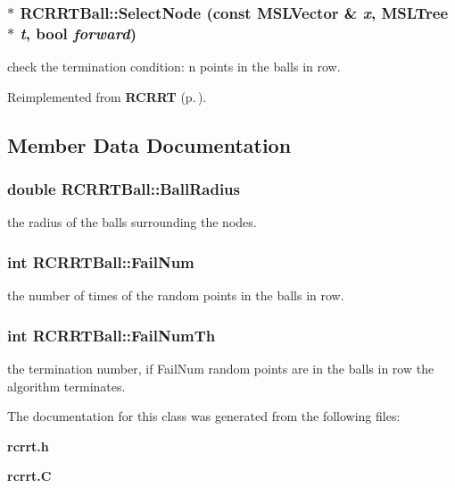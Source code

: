\subsubsection{ $\ast$ RCRRTBall::Select\-Node (const {\bf MSLVector} \& {\em x}, {\bf MSLTree} $\ast$ {\em t}, bool {\em forward})\hspace{0.3cm}{\tt  [virtual]}}\label{classRCRRTBall_a2}


check the termination condition: n points in the balls in row.



Reimplemented from {\bf RCRRT} {\rm (p.\,\pageref{classRCRRT_a6})}.

\subsection{Member Data Documentation}
\subsubsection{\setlength{\rightskip}{0pt plus 5cm}double RCRRTBall::Ball\-Radius}\label{classRCRRTBall_m0}


the radius of the balls surrounding the nodes.

\subsubsection{\setlength{\rightskip}{0pt plus 5cm}int RCRRTBall::Fail\-Num}\label{classRCRRTBall_m2}


the number of times of the random points in the balls in row.

\subsubsection{\setlength{\rightskip}{0pt plus 5cm}int RCRRTBall::Fail\-Num\-Th}\label{classRCRRTBall_m1}


the termination number, if Fail\-Num random points are in the balls in row the algorithm terminates.



The documentation for this class was generated from the following files:\begin{CompactItemize}
\item 
{\bf rcrrt.h}\item 
{\bf rcrrt.C}\end{CompactItemize}
